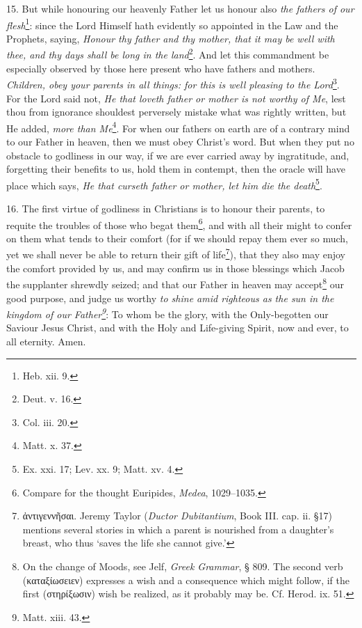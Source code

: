 15. But while honouring our heavenly Father let us honour also \emph{the fathers of our flesh}\footnote{Heb. xii. 9.}: since the Lord Himself hath evidently so appointed in the Law and the Prophets, saying, \emph{Honour thy father and thy mother, that it may be well with thee, and thy days shall be long in the land}\footnote{Deut. v. 16.}. And let this commandment be especially observed by those here present who have fathers and mothers. \emph{Children, obey your parents in all things: for this is well pleasing to the Lord}\footnote{Col. iii. 20.}. For the Lord said not, \emph{He that loveth father or mother is not worthy of Me}, lest thou from ignorance shouldest perversely mistake what was rightly written, but He added, \emph{more than Me}\footnote{Matt. x. 37.}. For when our fathers on earth are of a contrary mind to our Father in heaven, then we must obey Christ’s word. But when they put no obstacle to godliness in our way, if we are ever carried away by ingratitude, and, forgetting their benefits to us, hold them in contempt, then the oracle will have place which says, \emph{He that curseth father or mother, let him die the death}\footnote{Ex. xxi. 17; Lev. xx. 9; Matt. xv. 4.}.

16. The first virtue of godliness in Christians is to honour their parents, to requite the troubles of those who begat them\footnote{Compare for the thought Euripides, \emph{Medea}, 1029–1035.}, and with all their might to confer on them what tends to their comfort (for if we should repay them ever so much, yet we shall never be able to return their gift of life\footnote{\textgreek{ἀντιγεννῆσαι}. Jeremy Taylor (\emph{Ductor Dubitantium}, Book III. cap. ii. §17) mentions several stories in which a parent is nourished from a daughter’s breast, who thus ‘saves the life she cannot give.’}), that they also may enjoy the comfort provided by us, and may confirm us in those blessings which Jacob the supplanter shrewdly seized; and that our Father in heaven may accept\footnote{On the change of Moods, see Jelf, \emph{Greek Grammar}, § 809. The second verb (\textgreek{καταξίωσειεν}) expresses a wish and a consequence which might follow, if the first (\textgreek{στηρίξωσιν}) wish be realized, as it probably may be. Cf. Herod. ix. 51.} our good purpose, and judge us worthy \emph{to shine amid righteous as the sun in the kingdom of our Father\footnote{Matt. xiii. 43.}}: To whom be the glory, with the Only-begotten our Saviour Jesus Christ, and with the Holy and Life-giving Spirit, now and ever, to all eternity. Amen.

